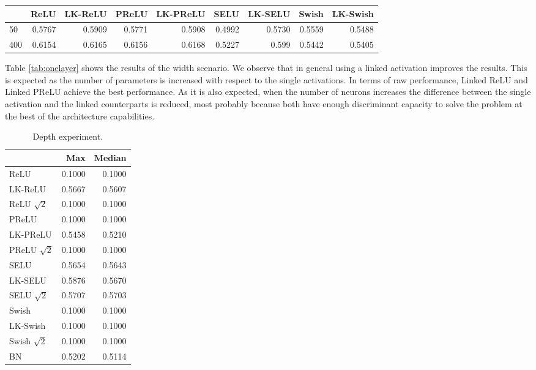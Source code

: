 \documentclass[10pt,twocolumn,letterpaper]{article}
\begin{document}
\begin{table*}[h]
    \centering
    
    \begin{tabular}{lrrrrrrrr}
	\toprule{} &    ReLU &   LK-ReLU &   PReLU &  LK-PReLU &    SELU &  LK-SELU &   Swish &  LK-Swish \\
	\midrule
	50 &  0.5767 &  0.5909 &  0.5771 &  0.5908 &  0.4992 &  0.5730 &  0.5559 &  0.5488 \\
	400 &  0.6154 &  0.6165 &  0.6156 &  0.6168 &  0.5227 &  0.599 &  0.5442 &  0.5405 \\
	\bottomrule
\end{tabular}
    
    \caption{Width experiment.}
    \label{tab:onelayer}
\end{table*}

Table \ref{tab:onelayer} shows the results of the width scenario. We observe that in general using a linked activation improves the results. This is expected as the number of parameters is increased with respect to the single activations. In terms of raw performance, Linked ReLU and Linked PReLU achieve the best performance. As it is also expected, when the number of neurons increases the difference between the single activation and the linked counterparts is reduced, most probably because both have enough discriminant capacity to solve the problem at the best of the architecture capabilities.

\begin{table}[h]
    \centering
    \begin{tabular}{lrr}
\toprule{} &     Max &  Median \\
\midrule
ReLU             &  0.1000 &  0.1000 \\
LK-ReLU          &  0.5667 &  0.5607 \\
ReLU $\sqrt{2}$  &  0.1000 &  0.1000 \\
PReLU            &  0.1000 &  0.1000 \\
LK-PReLU         &  0.5458 &  0.5210 \\
PReLU $\sqrt{2}$ &  0.1000 &  0.1000 \\
SELU             &  0.5654 &  0.5643 \\
LK-SELU          &  0.5876 &  0.5670 \\
SELU $\sqrt{2}$  &  0.5707 &  0.5703 \\
Swish            &  0.1000 &  0.1000 \\
LK-Swish         &  0.1000 &  0.1000 \\
Swish $\sqrt{2}$ &  0.1000 &  0.1000 \\
BN               &  0.5202 &  0.5114 \\
\bottomrule
\end{tabular}
    \caption{Depth experiment.}
    \label{tab:basicnet}
\end{table}
\end{document}
